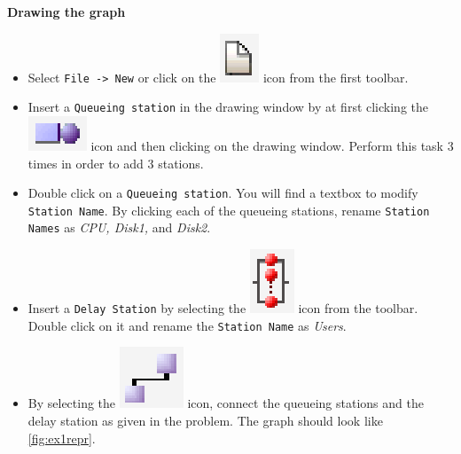 \noindent \textbf{Drawing the graph}
\begin{itemize}
\item  Select \texttt{File -> New} or click on the
\includegraphics[scale=.5]{img/jsimg/new.eps} icon from
the first toolbar. \item Insert a \texttt{Queueing station} in the
drawing window by at first clicking the
\includegraphics[scale=.5]{img/jsimg/insertServer} icon and then clicking
on the drawing window. Perform this task 3 times in order to add 3
stations. \item Double click on a \texttt{Queueing station}. You
will find a textbox to modify \texttt{Station Name}. By clicking
each of the queueing stations, rename \texttt{Station Names} as
\emph{CPU, Disk1,} and \emph{Disk2}. \item Insert a \texttt{Delay
Station} by selecting the
\includegraphics[scale=.5]{img/jsimg/insertDelay} icon from
the toolbar. Double click on it and rename the \texttt{Station
Name} as \emph{Users}. \item By selecting the
\includegraphics[scale=.5]{img/jsimg/connect} icon, connect
the queueing stations and the delay station as given in the
problem. The graph should look like \autoref{fig:ex1repr}.
\end{itemize}
